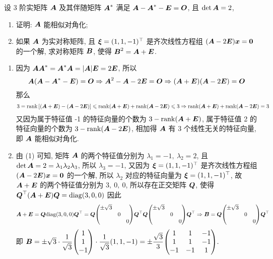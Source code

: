 \begin{example}
    设 3 阶实矩阵 $\vb*{A}$ 及其伴随矩阵 $\vb*{A}^*$ 满足 $\vb*{A}-\vb*{A}^*-\vb*{E}=\vb*{O}$, 且 $\det\vb*{A}=2$, 
    \begin{enumerate}[label=(\arabic{*})]
        \item 证明: $\vb*{A}$ 能相似对角化;
        \item 如果 $\vb*{A}$ 为实对称矩阵, 且 $\vb*{\xi}=(1,1,-1)^\top$ 是齐次线性方程组 $(\vb*{A}-2\vb*{E})\vb*{x}=\vb*{0}$ 的一个解, 求对称矩阵 $\vb*{B}$, 使得 $\vb*{B}^2=\vb*{A}+\vb*{E}$.
    \end{enumerate}
\end{example}
\begin{solution}
    \begin{enumerate}[label=(\arabic{*})]
        \item 因为 $\vb*{AA}^*=\vb*{A}^*\vb*{A}=|\vb*{A}|\vb*{E}=2\vb*{E}$, 所以
              $$\vb*{A}\qty(\vb*{A}-\vb*{A}^*-\vb*{E})=\vb*{O}\Rightarrow \vb*{A}^2-\vb*{A}-2\vb*{E}=\vb*{O}\Rightarrow (\vb*{A}+\vb*{E})(\vb*{A}-2\vb*{E})=\vb*{O}$$
              那么 $$3=\rank\qty[(\vb*{A}+\vb*{E})-(\vb*{A}-2\vb*{E})]\leqslant \rank(\vb*{A}+\vb*{E})+\rank(\vb*{A}-2\vb*{E})\leqslant 3\Rightarrow \rank(\vb*{A}+\vb*{E})+\rank(\vb*{A}-2\vb*{E})=3$$
              又因为属于特征值 -1 的特征向量的个数为 $3-\rank(\vb*{A}+\vb*{E})$, 属于特征值 2 的特征向量的个数为 $3-\rank(\vb*{A}-2\vb*{E})$, 相加得 $\vb*{A}$ 有 3 个线性无关的特征向量, 即 $\vb*{A}$ 能相似对角化.
        \item 由 (1) 可知, 矩阵 $\vb*{A}$ 的两个特征值分别为 $\lambda_1=-1,~\lambda_2=2$, 且 $\det\vb*{A}=2=\lambda_1\lambda_2\lambda_3$, 所以 $\lambda_3=-1$, 又因为 $\vb*{\xi}=(1,1,-1)^\top$ 是齐次线性方程组 $(\vb*{A}-2\vb*{E})\vb*{x}=\vb*{0}$ 的一个解, 
              所以 $\lambda_2$ 对应的特征向量为 $\vb*{\xi}=(1,1,-1)^\top$, 故 $\vb*{A}+\vb*{E}$ 的两个特征值分别为 $3,~0,~0$, 所以存在正交矩阵 $\vb*{Q}$, 使得 $\vb*{Q}^\top(\vb*{A}+\vb*{E})\vb*{Q}=\mathrm{diag}(3,0,0)$
              因此 $$\vb*{A}+\vb*{E}=\vb*{Q}\diag(3,0,0)\vb*{Q}^\top=\vb*{Q}\mqty(\dmat{\pm\sqrt{3},0,0})\vb*{Q}^\top\vb*{Q}\mqty(\dmat{\pm\sqrt{3},0,0})\vb*{Q}^\top\Rightarrow \vb*{B}=\vb*{Q}\mqty(\dmat{\pm\sqrt{3},0,0})\vb*{Q}^\top$$
              即 $\vb*{B}=\pm\sqrt{3}\cdot\dfrac{1}{\sqrt{3}}\mqty(1\\1\\-1)\cdot\dfrac{1}{\sqrt{3}}(1,1,-1)=\pm\dfrac{\sqrt{3}}{3}\mqty(1&1&-1\\1&1&-1\\-1&-1&1).$
    \end{enumerate}
\end{solution}

